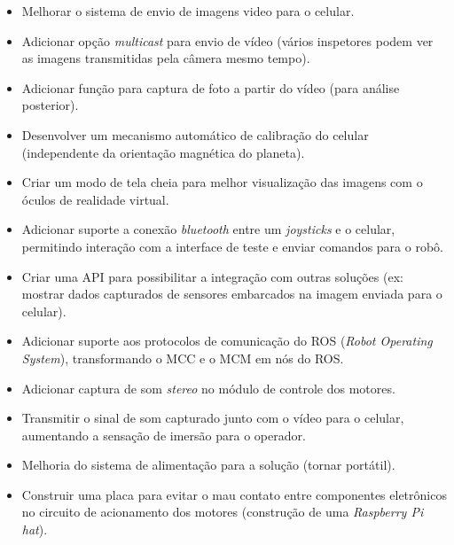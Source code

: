 \begin{itemize}
\item Melhorar o sistema de envio de imagens video para o celular.
\item Adicionar opção \textit{multicast} para envio de vídeo (vários inspetores podem ver as imagens transmitidas pela câmera mesmo tempo).
\item Adicionar função para captura de foto a partir do vídeo (para análise posterior).
\item Desenvolver um mecanismo automático de calibração do celular (independente da orientação magnética do planeta).
\item Criar um modo de tela cheia para melhor visualização das imagens com o óculos de realidade virtual.
\item Adicionar suporte a conexão \textit{bluetooth} entre um \textit{joysticks} e o celular, permitindo interação com a interface de teste e enviar comandos para o robô.
\item Criar uma API para possibilitar a integração com outras soluções (ex: mostrar dados capturados de sensores embarcados na imagem enviada para o celular).
\item Adicionar suporte aos protocolos de comunicação do ROS (\textit{Robot Operating System}), transformando o MCC e o MCM em nós do ROS. 
\item Adicionar captura de som \textit{stereo} no módulo de controle dos motores.
\item Transmitir o sinal de som capturado junto com o vídeo para o celular, aumentando a sensação de imersão para o operador.
\item Melhoria do sistema de alimentação para a solução (tornar portátil).
\item Construir uma placa para evitar o mau contato entre componentes eletrônicos no circuito de acionamento dos motores (construção de uma \textit{Raspberry Pi hat}).
\end{itemize}
